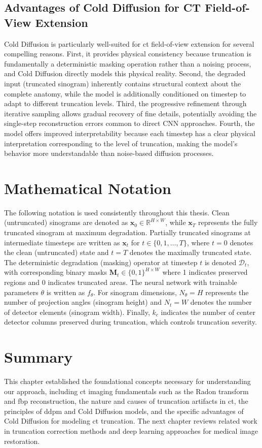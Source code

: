\subsection{Advantages of Cold Diffusion for CT Field-of-View Extension}

Cold Diffusion is particularly well-suited for \gls{ct} field-of-view extension for several compelling reasons. First, it provides physical consistency because truncation is fundamentally a deterministic masking operation rather than a noising process, and Cold Diffusion directly models this physical reality. Second, the degraded input (truncated sinogram) inherently contains structural context about the complete anatomy, while the model is additionally conditioned on timestep to adapt to different truncation levels. Third, the progressive refinement through iterative sampling allows gradual recovery of fine details, potentially avoiding the single-step reconstruction errors common to direct CNN approaches. Fourth, the model offers improved interpretability because each timestep has a clear physical interpretation corresponding to the level of truncation, making the model's behavior more understandable than noise-based diffusion processes.

\section{Mathematical Notation}

The following notation is used consistently throughout this thesis. Clean (untruncated) sinograms are denoted as $\mathbf{x}_0 \in \mathbb{R}^{H \times W}$, while $\mathbf{x}_T$ represents the fully truncated sinogram at maximum degradation. Partially truncated sinograms at intermediate timesteps are written as $\mathbf{x}_t$ for $t \in \{0, 1, \ldots, T\}$, where $t=0$ denotes the clean (untruncated) state and $t=T$ denotes the maximally truncated state. The deterministic degradation (masking) operator at timestep $t$ is denoted $\mathcal{D}_t$, with corresponding binary masks $\mathbf{M}_t \in \{0, 1\}^{H \times W}$ where 1 indicates preserved regions and 0 indicates truncated areas. The neural network with trainable parameters $\theta$ is written as $f_\theta$. For sinogram dimensions, $N_\theta = H$ represents the number of projection angles (sinogram height) and $N_t = W$ denotes the number of detector elements (sinogram width). Finally, $k_c$ indicates the number of center detector columns preserved during truncation, which controls truncation severity.

\section{Summary}

This chapter established the foundational concepts necessary for understanding our approach, including \gls{ct} imaging fundamentals such as the Radon transform and \gls{fbp} reconstruction, the nature and causes of truncation artifacts in \gls{ct}, the principles of \gls{ddpm} and Cold Diffusion models, and the specific advantages of Cold Diffusion for modeling \gls{ct} truncation. The next chapter reviews related work in truncation correction methods and deep learning approaches for medical image restoration.
